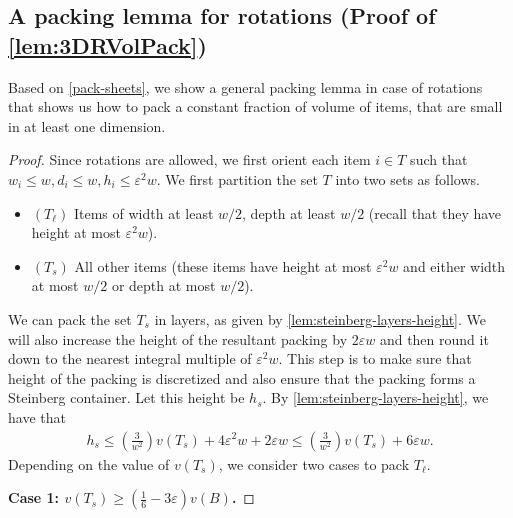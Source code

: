 \documentclass[10pt,a4paper]{amsart}
\newcommand{\eps}{\varepsilon}
\theoremstyle{definition}
\begin{document}
\subsection{A packing lemma for rotations (Proof of \texorpdfstring{\cref{lem:3DRVolPack}}{Lemma 2.6})}
\label{sec:3dr-vol-pack}
Based on \cref{pack-sheets}, we show a general packing lemma in case of rotations that shows us how to pack a constant fraction
of volume of items, that are small in at least one dimension.

\tDRVolPack*
\begin{proof}
    Since rotations are allowed, we first orient each item $i\in T$ such that $w_i\le w,d_i\le w,h_i\le \eps^2 w$.
We first partition the set $T$ into two sets as follows.
\begin{itemize}
	\item $(T_{\ell})$ Items of width at least $w/2$, depth at least $w/2$ (recall that they have height at most $\eps^2 w$).
	\item {$(T_s)$ All other items (these items have height at most $\eps^2 w$
	and either width at most $w/2$ or depth at most $w/2$).}
\end{itemize}
We can pack the set $T_s$ in layers, as given by \cref{lem:steinberg-layers-height}.
We will also increase the height of the resultant packing by $2\eps w$
and then round it down to the nearest integral multiple of $\eps^2 w$.
This step is to make sure that height of the packing is discretized and also ensure that
the packing forms a Steinberg container.
Let this height be $h_s$. By \cref{lem:steinberg-layers-height}, we have that
\begin{align}
    h_s\le \left(\frac{3}{w^2}\right)v(T_s)+4\eps^2 w+2\eps w\le \left(\frac{3}{w^2}\right)v(T_s)+6\eps w.\label{eq:hs-upper-bound}
\end{align}
Depending on the value of $v(T_s)$, we consider two cases to pack $T_{\ell}$.

\textbf{Case 1: $\displaystyle v(T_s)\ge \left(\frac16-3\eps\right)v(B)$.}


\end{proof}
\end{document}
